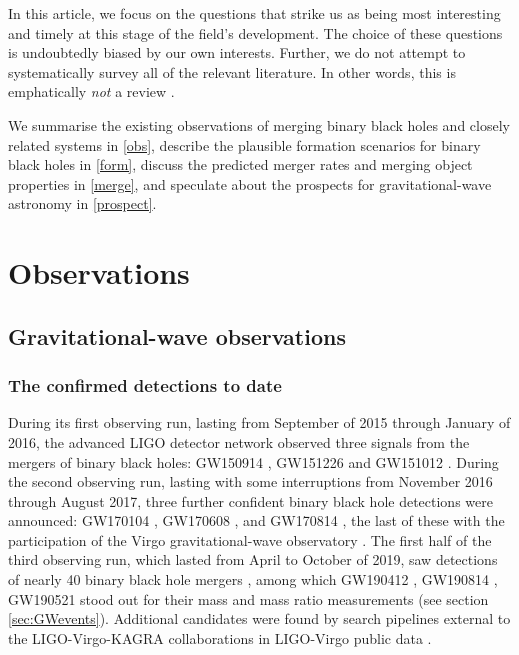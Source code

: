 \documentclass[review]{elsarticle}
\begin{document}
In this article, we focus on the questions that strike us as being most interesting and timely at this stage of the field's development.  The choice of these questions is undoubtedly biased by our own interests. Further, we do not attempt to systematically survey all of the relevant literature.  In other words, this is emphatically {\it not} a review \citep{magritte}. 

We summarise the existing observations of merging binary black holes and closely related systems in \autoref{obs}, describe the plausible formation scenarios for binary black holes in \autoref{form}, discuss the predicted merger rates and merging object properties in \autoref{merge}, and speculate about the prospects for gravitational-wave astronomy in \autoref{prospect}.


 

\section{Observations}\label{obs}

\subsection{Gravitational-wave observations}


\subsubsection{The confirmed detections to date}
During its first observing run, lasting from September of 2015 through January of 2016, the advanced LIGO detector network observed three signals from the mergers of binary black holes:  GW150914 \citep{GW150914}, GW151226 \citep{GW151226} and GW151012 \citep{GW150914:rates,BBH:O1}.  During the second observing run, lasting with some interruptions from November 2016 through August 2017, three further confident binary black hole detections were announced: GW170104 \citep{GW170104},  GW170608 \citep{GW170608}, and GW170814 \citep{GW170814}, the last of these with the participation of the Virgo gravitational-wave observatory \citep{AdvVirgo}.  The first half of the third observing run, which lasted from April to October of 2019, saw detections of nearly 40 binary black hole mergers \citep{GWTC2,Abbott:2021-GWTC-2-1}, among which GW190412 \citep{GW190412}, GW190814 \citep{GW190814}, GW190521 \citep{GW190521} stood out for their mass and mass ratio measurements (see section \ref{sec:GWevents}).  Additional candidates were found by search pipelines external to the LIGO-Virgo-KAGRA collaborations in LIGO-Virgo public data \citep{Nitz:2019,Nitz:2021,Venumadhav:2019,Venumadhav:2020}.  
\end{document}

